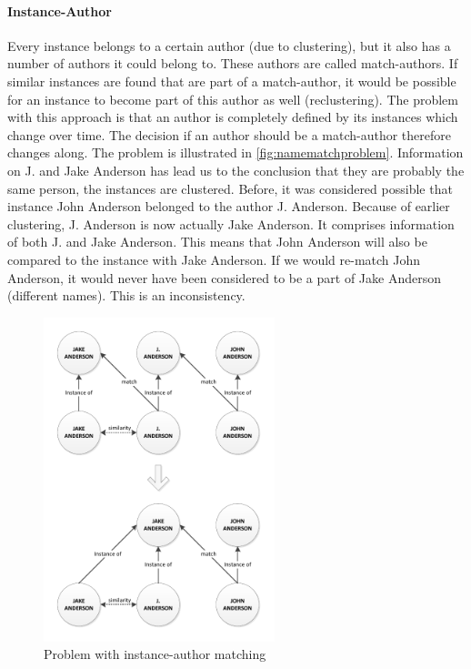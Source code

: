 \paragraph{Instance-Author} Every instance belongs to a certain author (due to clustering), but it also has a number of authors it could belong to. These authors are called match-authors. If similar instances are found that are part of a match-author, it would be possible for an instance to become part of this author as well (reclustering). The problem with this approach is that an author is completely defined by its instances which change over time. The decision if an author should be a match-author therefore changes along. The problem is illustrated in \autoref{fig:namematchproblem}. Information on J. and Jake Anderson has lead us to the conclusion that they are probably the same person, the instances are clustered. Before, it was considered possible that instance John Anderson belonged to the author J. Anderson. Because of earlier clustering, J. Anderson is now actually Jake Anderson. It comprises information of both J. and Jake Anderson. This means that John Anderson will also be compared to the instance with Jake Anderson. If we would re-match John Anderson, it would never have been considered to be a part of Jake Anderson (different names). This is an inconsistency.

\begin{figure}[htb]
	\centering
		\includegraphics[width=0.6\textwidth]{fig/namematchproblem}
	\caption{Problem with instance-author matching}
	\label{fig:namematchproblem}
\end{figure}

